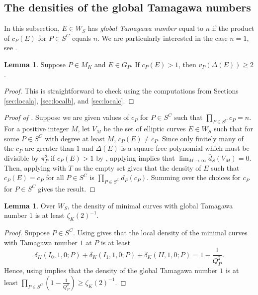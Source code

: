 \documentclass[12pt,letterpaper]{amsart}
\theoremstyle{definition}
\newtheorem{lemma}[theorem]{Lemma}
\begin{document}
\subsection{The densities of the global Tamagawa numbers}
\label{subsec:tamagawanum}

In this subsection, $E\in W_S$ has \textit{global Tamagawa number} equal to $n$ if the product of $c_P(E)$ for $P\in S^C$ equals $n$. We are particularly interested in the case $n=1$, see .

\begin{lemma}
\label{lemma:discsq}
Suppose $P\in M_K$ and $E\in G_P$. If $c_P(E)>1$, then $v_P(\Delta(E))\geq 2$.
\end{lemma}

\begin{proof}
This is straightforward to check using the computations from Sections \ref{sec:locala}, \ref{sec:localb}, and \ref{sec:localc}.
\end{proof}

\begin{proof}[Proof of ]
Suppose we are given values of $c_P$ for $P\in S^C$ such that $\prod_{P\in S^C} c_P=n$. For a positive integer $M$, let $V_M$ be the set of elliptic curves $E\in W_S$ such that for some $P\in S^C$ with degree at least $M$, $c_P(E)\not=c_P$. Since only finitely many of the $c_P$ are greater than $1$ and $\Delta(E)$ is a square-free polynomial which must be divisible by $\pi_P^2$ if $c_P(E)>1$ by , applying  implies that $\lim_{M\rightarrow\infty} \overline{d}_S(V_M)=0$. Then, applying  with $T$ as the empty set gives that the density of $E$ such that $c_P(E)=c_P$ for all $P\in S^C$ is $\prod_{P\in S^C} d_P(c_P)$. Summing over the choices for $c_P$ for $P\in S^C$ gives the result.
\end{proof}

\begin{lemma}
\label{lemma:globaldensitytam1} Over $W_S$, the density of minimal curves with global Tamagawa number $1$ is at least $\zeta_K(2)^{-1}$.
\end{lemma}

\begin{proof}
Suppose $P\in S^C$. Using  gives that the local density of the minimal curves with Tamagawa number $1$ at $P$ is at least
\[
\delta_K(I_0, 1, 0; P) + \delta_K(I_1, 1, 0; P) + \delta_K(II, 1, 0; P) = 1-\frac{1}{Q_P^2}.
\]
Hence, using  implies that the density of the global Tamagawa number $1$ is at least $\prod_{P\in S^C} \left(1-\frac{1}{Q_P^2}\right) \geq \zeta_K(2)^{-1}$.
\end{proof}
\end{document}
